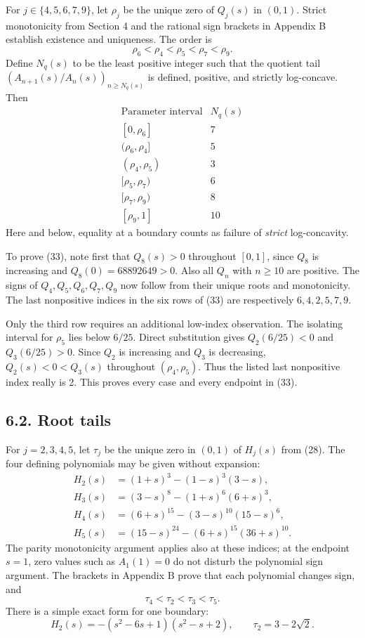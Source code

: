 \documentclass[
  11pt,
  a4paper,
]{article}
\begin{document}
For \(j\in\{4,5,6,7,9\}\), let \(\rho_j\) be the unique zero of
\(Q_j(s)\) in \((0,1)\). Strict monotonicity from Section 4 and the
rational sign brackets in Appendix B establish existence and uniqueness.
The order is \[
\rho_6<\rho_4<\rho_5<\rho_7<\rho_9.
\tag{32}
\] Define \(N_q(s)\) to be the least positive integer such that the
quotient tail \((A_{n+1}(s)/A_n(s))_{n\ge N_q(s)}\) is defined,
positive, and strictly log-concave. Then \[
\begin{array}{c|c}
\text{Parameter interval}&N_q(s)\\\hline
{[0,\rho_6]}&7\\
(\rho_6,\rho_4]&5\\
(\rho_4,\rho_5)&3\\
{[\rho_5,\rho_7)}&6\\
{[\rho_7,\rho_9)}&8\\
{[\rho_9,1]}&10
\end{array}
\tag{33}
\] Here and below, equality at a boundary counts as failure of
\emph{strict} log-concavity.

To prove (33), note first that \(Q_8(s)>0\) throughout \([0,1]\), since
\(Q_8\) is increasing and \(Q_8(0)=68892649>0\). Also all \(Q_n\) with
\(n\ge10\) are positive. The signs of \(Q_4,Q_5,Q_6,Q_7,Q_9\) now follow
from their unique roots and monotonicity. The last nonpositive indices
in the six rows of (33) are respectively \(6,4,2,5,7,9\).

Only the third row requires an additional low-index observation. The
isolating interval for \(\rho_5\) lies below \(6/25\). Direct
substitution gives \(Q_2(6/25)<0\) and \(Q_3(6/25)>0\). Since \(Q_2\) is
increasing and \(Q_3\) is decreasing, \(Q_2(s)<0<Q_3(s)\) throughout
\((\rho_4,\rho_5)\). Thus the listed last nonpositive index really is 2.
This proves every case and every endpoint in (33).

\subsection{6.2. Root tails}\label{root-tails}

For \(j=2,3,4,5\), let \(\tau_j\) be the unique zero in \((0,1)\) of
\(H_j(s)\) from (28). The four defining polynomials may be given without
expansion: \[
\begin{aligned}
H_2(s)&=(1+s)^3-(1-s)^3(3-s),\\
H_3(s)&=(3-s)^8-(1+s)^6(6+s)^3,\\
H_4(s)&=(6+s)^{15}-(3-s)^{10}(15-s)^6,\\
H_5(s)&=(15-s)^{24}-(6+s)^{15}(36+s)^{10}.
\end{aligned}
\tag{34}
\] The parity monotonicity argument applies also at these indices; at
the endpoint \(s=1\), zero values such as \(A_1(1)=0\) do not disturb
the polynomial sign argument. The brackets in Appendix B prove that each
polynomial changes sign, and \[
\tau_4<\tau_2<\tau_3<\tau_5.
\tag{35}
\] There is a simple exact form for one boundary: \[
H_2(s)=-(s^2-6s+1)(s^2-s+2),\qquad \tau_2=3-2\sqrt2.
\tag{36}
\]
\end{document}
